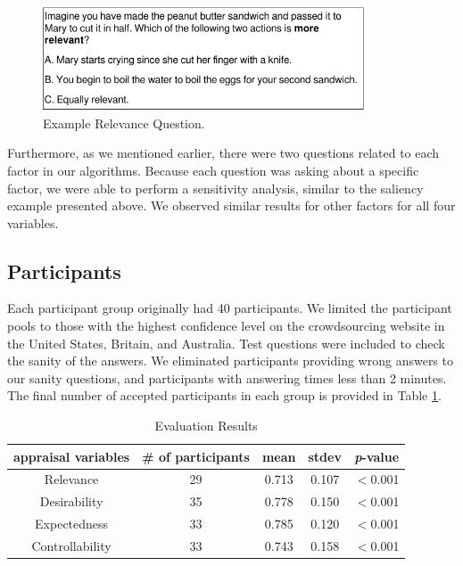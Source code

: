 \documentclass[12pt]{report}
\begin{document}
\begin{figure}[tbh]
  \centering
  \includegraphics[width=0.85\textwidth]{figure/question-sample4-croped.pdf}
  \caption{{\fontsize{9}{9}\selectfont Example Relevance Question.}}
  \label{fig:qs4}
  \vspace{-5mm}
\end{figure}

Furthermore, as we mentioned earlier, there were two questions related to each
factor in our algorithms. Because each question was asking about a specific
factor, we were able to perform a sensitivity analysis, similar to the saliency
example presented above. We observed similar results for other factors for all
four variables.

\subsection{Participants}
Each participant group originally had 40 participants. We limited the
participant pools to those with the highest confidence level on the
crowdsourcing website in the United States, Britain, and Australia. Test
questions were included to check the sanity of the answers. We eliminated
participants providing wrong answers to our sanity questions, and participants with
answering times less than 2 minutes. The final number of accepted participants
in each group is provided in Table \ref{tbl:statistics}.

\begin{table}[htbp]
\vspace*{-3mm}
\centering
\caption{Evaluation Results}
\begin{tabular}{|c|c|c|c|c|} \hline
appraisal variables & \# of participants & mean & stdev & \textit{p}-value\\ \hline 
Relevance &  29 & 0.713 & 0.107 & $<$0.001\\ \hline
Desirability & 35 & 0.778 & 0.150 & $<$0.001\\ \hline 
Expectedness & 33 & 0.785 & 0.120 & $<$0.001\\ \hline 
Controllability & 33 & 0.743 & 0.158 & $<$0.001\\ \hline
\end{tabular}
\label{tbl:statistics}
\vspace*{-3mm}
\end{table}
\end{document}

